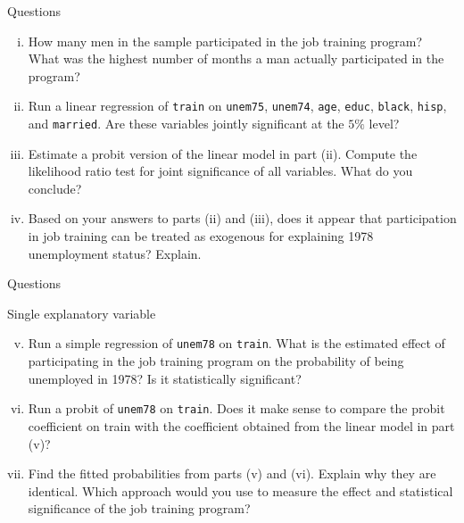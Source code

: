 \documentclass[
  10pt,
  ignorenonframetext,
]{beamer}
\providecommand{\tightlist}{%
  \setlength{\itemsep}{0pt}\setlength{\parskip}{0pt}}
\begin{document}
\begin{frame}[fragile]{Questions}
\protect\hypertarget{questions}{}
\begin{enumerate}
[(i)]
\item
  How many men in the sample participated in the job training program?
  What was the highest number of months a man actually participated in
  the program?
\item
  Run a linear regression of \texttt{train} on \texttt{unem75},
  \texttt{unem74}, \texttt{age}, \texttt{educ}, \texttt{black},
  \texttt{hisp}, and \texttt{married}. Are these variables jointly
  significant at the \(5\%\) level?
\item
  Estimate a probit version of the linear model in part (ii). Compute
  the likelihood ratio test for joint significance of all variables.
  What do you conclude?
\item
  Based on your answers to parts (ii) and (iii), does it appear that
  participation in job training can be treated as exogenous for
  explaining 1978 unemployment status? Explain.
\end{enumerate}
\end{frame}

\begin{frame}[fragile]{Questions}
\protect\hypertarget{questions-1}{}
\begin{block}{Single explanatory variable}
\protect\hypertarget{single-explanatory-variable}{}
\begin{enumerate}
[(a)]
\setcounter{enumi}{21}
\tightlist
\item
  Run a simple regression of \texttt{unem78} on \texttt{train}. What is
  the estimated effect of participating in the job training program on
  the probability of being unemployed in 1978? Is it statistically
  significant?
\end{enumerate}

\begin{enumerate}
[(i)]
\setcounter{enumi}{5}
\item
  Run a probit of \texttt{unem78} on \texttt{train}. Does it make sense
  to compare the probit coefficient on train with the coefficient
  obtained from the linear model in part (v)?
\item
  Find the fitted probabilities from parts (v) and (vi). Explain why
  they are identical. Which approach would you use to measure the effect
  and statistical significance of the job training program?
\end{enumerate}
\end{block}
\end{frame}
\end{document}
